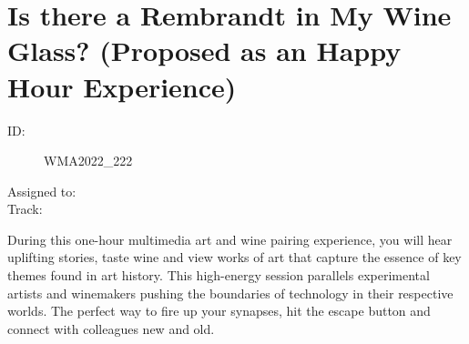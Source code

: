 \documentclass{report}
\begin{document}
              

              
        
          \newpage
          \section{ Is there a Rembrandt in My Wine Glass? (Proposed as an Happy Hour Experience) }
            \begin{description}
              \item [ID:]
              WMA2022\_222

              \item [Assigned to:]
                \item [Track:]
              \end{description}

              During this one-hour multimedia art and wine pairing experience, you will hear uplifting stories, taste wine and view works of art that capture the essence of key themes found in art history. This high-energy session parallels experimental artists and winemakers pushing the boundaries of technology in their respective worlds. The perfect way to fire up your synapses, hit the escape button and connect with colleagues new and old.
\end{document}
